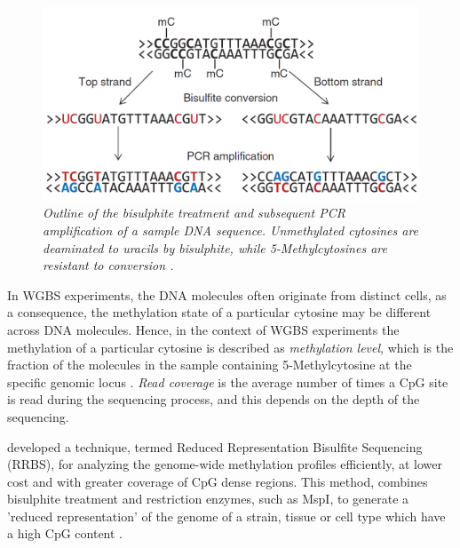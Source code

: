 \begin{figure}[!h]
	\begin{center}
 		\includegraphics[scale = 0.43]{images/bis-treatment.png}
		\caption{\emph{Outline of the bisulphite treatment and subsequent PCR amplification of a sample DNA sequence. Unmethylated cytosines are deaminated to uracils by bisulphite, while 5-Methylcytosines are resistant to conversion \citep{Krueger2012}.}}
		\label{bisulphite-pic}
	\end{center}
\end{figure} 

In WGBS experiments, the DNA molecules often originate from distinct cells, as a consequence, the methylation state of a particular cytosine may be different across DNA molecules. Hence, in the context of WGBS experiments the methylation of a particular cytosine is described as \emph{methylation level}, which is the fraction of the molecules in the sample containing 5-Methylcytosine at the specific genomic locus \citep{Schultz2012}. \emph{Read coverage} is the average number of times a CpG site is read during the sequencing process, and this depends on the depth of the sequencing.

\cite{Meissner2005} developed a technique, termed Reduced Representation Bisulfite Sequencing (RRBS), for analyzing the genome-wide methylation profiles efficiently, at lower cost and with greater coverage of CpG dense regions. This method, combines bisulphite treatment and restriction enzymes, such as MspI, to generate a 'reduced representation' of the genome of a strain, tissue or cell type which have a high CpG content \citep{Meissner2005}. 

